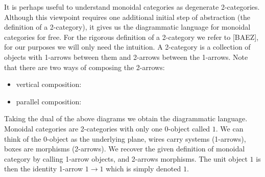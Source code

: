 \documentclass{article}
\newenvironment{remark}[1][Remark]{\begin{trivlist}
\item[\hskip \labelsep {\bfseries #1}]}{\end{trivlist}}
\begin{document}
\begin{remark}
	It is perhaps useful to understand monoidal categories as degenerate 2-categories. Although this viewpoint requires one additional initial step of abstraction (the definition of a 2-category), it gives us the diagrammatic language for monoidal categories for free. For the rigorous definition of a 2-category we refer to [BAEZ], for our purposes we will only need the intuition. A 2-category is a collection of objects with 1-arrows between them and 2-arrows between the 1-arrows. Note that there are two ways of composing the 2-arrows:
	\begin{itemize}
		\item vertical composition:
		\begin{center}
		\end{center}
		\item parallel composition:
		\begin{center}
		\end{center}
	\end{itemize}
	Taking the dual of the above diagrams we obtain the diagrammatic language. Monoidal categories are 2-categories with only one 0-object called $1$. We can think of the 0-object as the underlying plane, wires carry systems (1-arrows), boxes are morphisms (2-arrows). We recover the given definition of monoidal category by calling 1-arrow objects, and 2-arrows morphisms. The unit object $1$ is then the identity 1-arrow $1 \rightarrow 1$ which is simply denoted $1$.
\end{remark}
\end{document}

